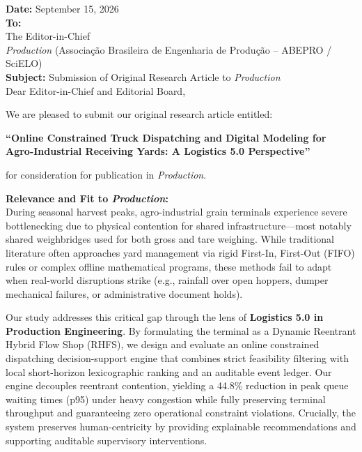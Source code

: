 \documentclass[12pt,a4paper]{article}
\begin{document}
\noindent\textbf{Date:} September 15, 2026\\[1.5em]
\noindent\textbf{To:}\\
The Editor-in-Chief\\
\textit{Production} (Associação Brasileira de Engenharia de Produção -- ABEPRO / SciELO)\\[1.5em]
\noindent\textbf{Subject:} Submission of Original Research Article to \textit{Production}\\[1em]
\noindent Dear Editor-in-Chief and Editorial Board,

We are pleased to submit our original research article entitled:
\begin{center}
  \textbf{“Online Constrained Truck Dispatching and Digital Modeling for Agro-Industrial Receiving Yards: A Logistics 5.0 Perspective”}
\end{center}
for consideration for publication in \textit{Production}.

\vspace{1em}
\noindent\textbf{Relevance and Fit to \textit{Production}:}\\
During seasonal harvest peaks, agro-industrial grain terminals experience severe bottlenecking due to physical contention for shared infrastructure—most notably shared weighbridges used for both gross and tare weighing. While traditional literature often approaches yard management via rigid First-In, First-Out (FIFO) rules or complex offline mathematical programs, these methods fail to adapt when real-world disruptions strike (e.g., rainfall over open hoppers, dumper mechanical failures, or administrative document holds).

Our study addresses this critical gap through the lens of \textbf{Logistics 5.0 in Production Engineering}. By formulating the terminal as a Dynamic Reentrant Hybrid Flow Shop (RHFS), we design and evaluate an online constrained dispatching decision-support engine that combines strict feasibility filtering with local short-horizon lexicographic ranking and an auditable event ledger. Our engine decouples reentrant contention, yielding a 44.8\% reduction in peak queue waiting times (p95) under heavy congestion while fully preserving terminal throughput and guaranteeing zero operational constraint violations. Crucially, the system preserves human-centricity by providing explainable recommendations and supporting auditable supervisory interventions.
\end{document}

